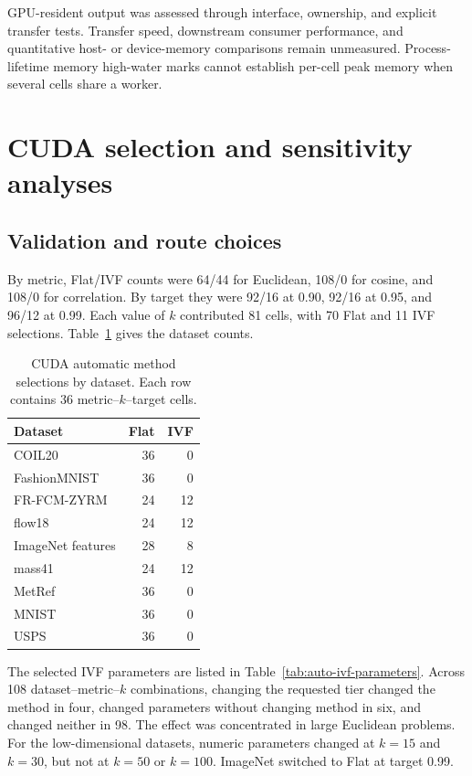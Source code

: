 \documentclass[11pt]{article}
\begin{document}
GPU-resident output was assessed through interface, ownership, and explicit
transfer tests. Transfer speed, downstream consumer performance, and
quantitative host- or device-memory comparisons remain unmeasured.
Process-lifetime memory high-water marks cannot establish per-cell peak memory
when several cells share a worker.

\section{CUDA selection and sensitivity analyses}
\label{sec:supp-selector}

\subsection{Validation and route choices}

By metric, Flat/IVF counts were 64/44 for Euclidean, 108/0 for cosine, and
108/0 for correlation. By target they were 92/16 at 0.90, 92/16 at 0.95,
and 96/12 at 0.99. Each value of $k$ contributed 81 cells, with 70 Flat and
11 IVF selections. Table~\ref{tab:supp-auto-routes} gives the dataset counts.

\begin{table}[h]
\centering

\begin{tabularx}{\textwidth}{@{}Xrr@{}}
\toprule
Dataset & Flat & IVF \\
\midrule
COIL20 & 36 & 0 \\
FashionMNIST & 36 & 0 \\
FR-FCM-ZYRM & 24 & 12 \\
flow18 & 24 & 12 \\
ImageNet features & 28 & 8 \\
mass41 & 24 & 12 \\
MetRef & 36 & 0 \\
MNIST & 36 & 0 \\
USPS & 36 & 0 \\
\bottomrule
\end{tabularx}
\caption{CUDA automatic method selections by dataset. Each row contains 36
metric--$k$--target cells.}
\label{tab:supp-auto-routes}
\end{table}

The selected IVF parameters are listed in
Table~\ref{tab:auto-ivf-parameters}. Across 108 dataset--metric--$k$
combinations, changing the requested tier changed the method in four,
changed parameters without changing method in six, and changed neither in
98. The effect was concentrated in large Euclidean problems. For the
low-dimensional datasets, numeric parameters changed at $k=15$ and $k=30$,
but not at $k=50$ or $k=100$. ImageNet switched to Flat at target 0.99.
\end{document}
